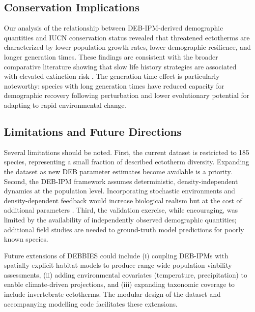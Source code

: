 \documentclass[11pt]{article}
\begin{document}
\subsection{Conservation Implications}

Our analysis of the relationship between DEB-IPM-derived demographic quantities and IUCN conservation status revealed that threatened ectotherms are characterized by lower population growth rates, lower demographic resilience, and longer generation times. These findings are consistent with the broader comparative literature showing that slow life history strategies are associated with elevated extinction risk \citep{stearns1992}. The generation time effect is particularly noteworthy: species with long generation times have reduced capacity for demographic recovery following perturbation and lower evolutionary potential for adapting to rapid environmental change.

\subsection{Limitations and Future Directions}

Several limitations should be noted. First, the current dataset is restricted to 185 species, representing a small fraction of described ectotherm diversity. Expanding the dataset as new DEB parameter estimates become available is a priority. Second, the DEB-IPM framework assumes deterministic, density-independent dynamics at the population level. Incorporating stochastic environments and density-dependent feedback would increase biological realism but at the cost of additional parameters \citep{grimm2005}. Third, the validation exercise, while encouraging, was limited by the availability of independently observed demographic quantities; additional field studies are needed to ground-truth model predictions for poorly known species.

Future extensions of DEBBIES could include (i) coupling DEB-IPMs with spatially explicit habitat models to produce range-wide population viability assessments, (ii) adding environmental covariates (temperature, precipitation) to enable climate-driven projections, and (iii) expanding taxonomic coverage to include invertebrate ectotherms. The modular design of the dataset and accompanying modelling code facilitates these extensions.

\end{document}
